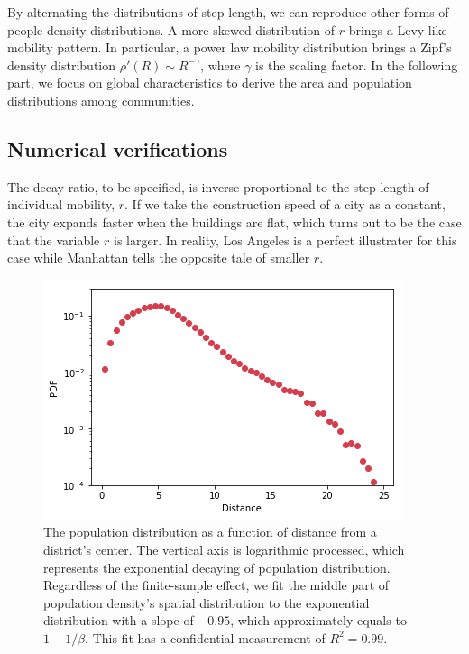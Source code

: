\documentclass[aps,prl]{revtex4-1}
\begin{document}
By alternating the distributions of step length, we can reproduce other forms of people density distributions. A more skewed distribution of $r$ brings a Levy-like mobility pattern. In particular, a power law mobility distribution brings a Zipf's density distribution $\rho '(R)\sim R^{-\gamma}$\cite{PhysRevX.4.011008}, where $\gamma$ is the scaling factor.  In the following part, we focus on global characteristics to derive the area and population distributions among communities.

\subsection{Numerical verifications}

The decay ratio, to be specified, is inverse proportional to the step length of individual mobility, $r$. If we take the construction speed of a city as a constant, the city expands faster when the buildings are flat, which turns out to be the case that the variable $r$ is larger. In reality, Los Angeles is a perfect illustrater for this case while Manhattan tells the opposite tale of smaller $r$.

\begin{figure}[ht]
\centering
\includegraphics[width=0.9\linewidth]{fig/clark.png}
\caption{The population distribution as a function of distance from a district's center. The vertical axis is logarithmic processed, which represents the exponential decaying of population distribution. Regardless of the finite-sample effect, we fit the middle part of population density's spatial distribution to the exponential distribution with a slope of $-0.95$, which approximately equals to $1-1/\beta.$ This fit has a confidential measurement of $R^2=0.99$.}
\label{fig:clark}
\end{figure}
\end{document}
